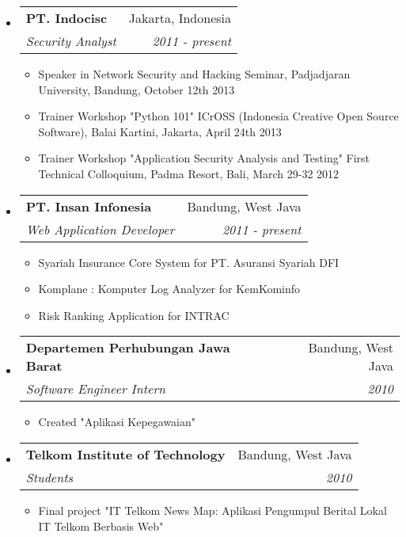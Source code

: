 \documentclass[letterpaper,11pt]{article}
\makeatletter
\newcommand{\resitem}[1]{\item #1 \vspace{-2pt}}
\newcommand{\ressubheading}[4]{

\begin{tabular*}{6.5in}{l@{\cftdotfill{\cftsecdotsep}\extracolsep{\fill}}r}

		\textbf{#1} & #2 \\

		\textit{#3} & \textit{#4} \\

\end{tabular*}\vspace{-6pt}}
\makeatother
\begin{document}
\begin{itemize}

\item

	\ressubheading{PT. Indocisc}{Jakarta, Indonesia}{Security Analyst}{2011 - present}

	\begin{itemize}

		\resitem{Speaker in Network Security and Hacking Seminar, Padjadjaran University, Bandung, October 12th 2013}

		\resitem{Trainer Workshop "Python 101" ICrOSS (Indonesia Creative Open Source Software), Balai Kartini, Jakarta, April 24th 2013}

		\resitem{Trainer Workshop "Application Security Analysis and Testing" First Technical Colloquium, Padma Resort, Bali, March 29-32 2012}

	\end{itemize}

\item

	\ressubheading{PT. Insan Infonesia}{Bandung, West Java}{Web Application Developer}{2011 - present}

	\begin{itemize}

		\resitem{Syariah Insurance Core System for PT. Asuransi Syariah DFI}

    	\resitem{Komplane : Komputer Log Analyzer for KemKominfo}

    	\resitem{Risk Ranking Application for INTRAC}

	\end{itemize}

\item

	\ressubheading{Departemen Perhubungan Jawa Barat}{Bandung, West Java}{Software Engineer Intern}{2010}

	\begin{itemize}

		\resitem{Created "Aplikasi Kepegawaian"}

	\end{itemize}

\item

	\ressubheading{Telkom Institute of Technology}{Bandung, West Java}{Students}{2010}

	\begin{itemize}

		\resitem{Final project "IT Telkom News Map: Aplikasi Pengumpul Berital Lokal IT Telkom Berbasis Web"}


\end{itemize}
\end{itemize}
\end{document}
